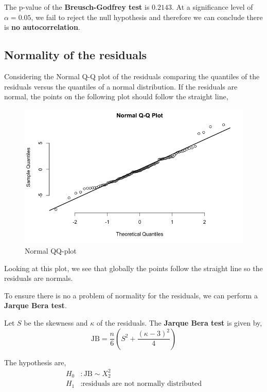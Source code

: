 The p-value of the \textbf{Breusch-Godfrey test} is $0.2143$. At a significance level of $\alpha = 0.05$, we fail to reject the null hypothesis and therefore we can conclude there is \textbf{no autocorrelation}. 

\subsection{Normality of the residuals}

Considering the Normal Q-Q plot of the residuals comparing the quantiles of the residuals versus the quantiles of a normal distribution. If the residuals are normal, the points on the following plot should follow the straight line,

\begin{figure}[H]
	\centering
	\includegraphics{figures/models/normal-qq-plot.png}
	\caption{Normal QQ-plot}
	\label{fig:normal-qq-plot}
\end{figure}

Looking at this plot, we see that globally the points follow the straight line so the residuals are normals.  

To ensure there is no a problem of normality for the residuals, we can perform a \textbf{Jarque Bera test}. 

Let $S$ be the skewness and $\kappa$ of the residuals. The \textbf{Jarque Bera test} is given by, 
\begin{equation}
	\text{JB} = \frac{n}{6} \left(S^2 + \frac{(\kappa - 3)^2}{4} \right)
\end{equation}

The hypothesis are, 
\begin{align*}
	H_0&: \text{JB} \sim X^2_2 \\
	H_1&: \text{residuals are not normally distributed}
\end{align*}

